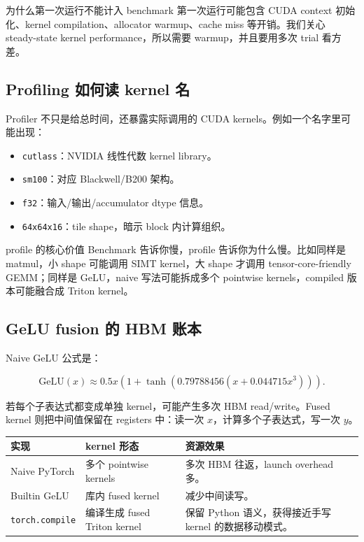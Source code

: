 \begin{knowledgebox}{为什么第一次运行不能计入 benchmark}
第一次运行可能包含 CUDA context 初始化、kernel compilation、allocator warmup、cache miss 等开销。我们关心 steady-state kernel performance，所以需要 warmup，并且要用多次 trial 看方差。
\end{knowledgebox}

\subsection{Profiling 如何读 kernel 名}

Profiler 不只是给总时间，还暴露实际调用的 CUDA kernels。例如一个名字里可能出现：

\begin{itemize}
    \item \texttt{cutlass}：NVIDIA 线性代数 kernel library。
    \item \texttt{sm100}：对应 Blackwell/B200 架构。
    \item \texttt{f32}：输入/输出/accumulator dtype 信息。
    \item \texttt{64x64x16}：tile shape，暗示 block 内计算组织。
\end{itemize}

\begin{importantbox}{profile 的核心价值}
Benchmark 告诉你慢，profile 告诉你为什么慢。比如同样是 matmul，小 shape 可能调用 SIMT kernel，大 shape 才调用 tensor-core-friendly GEMM；同样是 GeLU，naive 写法可能拆成多个 pointwise kernels，compiled 版本可能融合成 Triton kernel。
\end{importantbox}

\subsection{GeLU fusion 的 HBM 账本}

Naive GeLU 公式是：

\[
\mathrm{GeLU}(x)\approx 0.5x\left(1+\tanh\left(0.79788456(x+0.044715x^3)\right)
\right).
\]

若每个子表达式都变成单独 kernel，可能产生多次 HBM read/write。Fused kernel 则把中间值保留在 registers 中：读一次 \(x\)，计算多个子表达式，写一次 \(y\)。

\begin{longtable}{p{}p{}p{}}
\toprule
\textbf{实现} & \textbf{kernel 形态} & \textbf{资源效果} \\
\midrule
Naive PyTorch & 多个 pointwise kernels & 多次 HBM 往返，launch overhead 多。 \\
Builtin GeLU & 库内 fused kernel & 减少中间读写。 \\
\texttt{torch.compile} & 编译生成 fused Triton kernel & 保留 Python 语义，获得接近手写 kernel 的数据移动模式。 \\
\bottomrule
\end{longtable}

